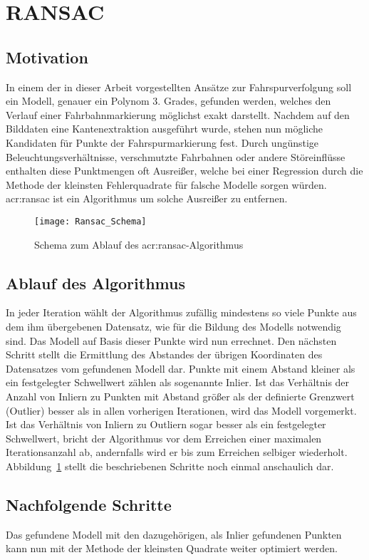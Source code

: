 \section{RANSAC \dcsecondauthorshort}
\subsection{Motivation}
In einem der in dieser Arbeit vorgestellten Ansätze zur Fahrspurverfolgung soll ein Modell, genauer ein Polynom 3. Grades, gefunden werden, welches den Verlauf einer Fahrbahnmarkierung möglichst exakt darstellt. Nachdem auf den Bilddaten eine Kantenextraktion ausgeführt wurde, stehen nun mögliche Kandidaten für Punkte der Fahrspurmarkierung fest. Durch ungünstige Beleuchtungsverhältnisse, verschmutzte Fahrbahnen oder andere Störeinflüsse enthalten diese Punktmengen oft Ausreißer, welche bei einer Regression durch die Methode der kleinsten Fehlerquadrate für falsche Modelle sorgen würden. \gls{acr:ransac} \autocite{fischler1981random} ist ein Algorithmus um solche Ausreißer zu entfernen.

\begin{figure}[H]
  \centering
  \texttt{[image: Ransac\_Schema]}
  \caption{Schema zum Ablauf des \gls{acr:ransac}-Algorithmus}
  \label{fig:ransac_scheme}
\end{figure}

\subsection{Ablauf des Algorithmus} \label{ssec:grunglagen:ransac:ablauf}
In jeder Iteration wählt der Algorithmus zufällig mindestens so viele Punkte aus dem ihm übergebenen Datensatz, wie für die Bildung des Modells notwendig sind. Das Modell auf Basis dieser Punkte wird nun errechnet. Den nächsten Schritt stellt die Ermittlung des Abstandes der übrigen Koordinaten des Datensatzes vom gefundenen Modell dar. Punkte mit einem Abstand kleiner als ein festgelegter Schwellwert zählen als sogenannte Inlier. Ist das Verhältnis der Anzahl von Inliern zu Punkten mit Abstand größer als der definierte Grenzwert (Outlier) besser als in allen vorherigen Iterationen, wird das Modell vorgemerkt. Ist das Verhältnis von Inliern zu Outliern sogar besser als ein festgelegter Schwellwert, bricht der Algorithmus vor dem Erreichen einer maximalen Iterationsanzahl ab, andernfalls wird er bis zum Erreichen selbiger wiederholt. Abbildung~\ref{fig:ransac_scheme} stellt die beschriebenen Schritte noch einmal anschaulich dar.

\subsection{Nachfolgende Schritte}
Das gefundene Modell mit den dazugehörigen, als Inlier gefundenen Punkten kann nun mit der Methode der kleinsten Quadrate weiter optimiert werden.




